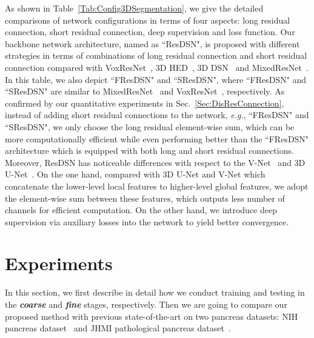 \documentclass[10pt,twocolumn,letterpaper]{article}
\begin{document}
As shown in Table~\ref{Tab:Config3DSegmentation}, we give the detailed comparisons of network configurations in terms of four aspects: long residual connection, short residual connection, deep supervision and loss function. Our backbone network architecture, named as ``ResDSN", is proposed with different strategies in terms of combinations of long residual connection and short residual connection compared with VoxResNet~\cite{chen2017voxresnet}, 3D HED~\cite{merkow2016dense}, 3D DSN~\cite{dou20173d} and MixedResNet~\cite{yu2017volumetric}. In this table, we also depict ``FResDSN" and ``SResDSN", where ``FResDSN" and ``SResDSN" are similar to MixedResNet~\cite{yu2017volumetric} and VoxResNet~\cite{chen2017voxresnet}, respectively. As confirmed by our quantitative experiments in Sec.~\ref{Sec:DisResConnection}, instead of adding short residual connections to the network, \emph{e.g.}, ``FResDSN" and ``SResDSN", we only choose the long residual element-wise sum, which can be more computationally efficient while even performing better than the ``FResDSN" architecture which is equipped with both long and short residual connections. Moreover, ResDSN has noticeable differences with respect to the V-Net~\cite{milletari2016v} and 3D U-Net~\cite{cciccek20163d}. On the one hand, compared with 3D U-Net and V-Net which concatenate the lower-level local features to higher-level global features, we adopt the element-wise sum between these features, which outputs less number of channels for efficient computation. On the other hand, we introduce deep supervision via auxiliary losses into the network to yield better convergence.

\section{Experiments}
In this section, we first describe in detail how we conduct training and testing in the \textit{\textbf{coarse}} and \textit{\textbf{fine}} stages, respectively. Then we are going to compare our proposed method with previous state-of-the-art on two pancreas datasets: NIH pancreas dataset~\cite{roth2015deeporgan} and JHMI pathological pancreas dataset~\cite{zhou2017deep}.
\end{document}
